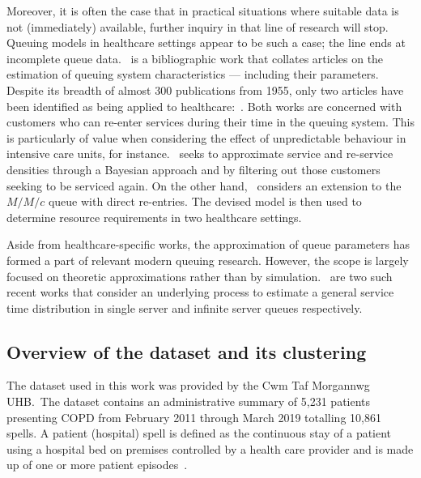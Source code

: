 \documentclass[11pt]{article}
\begin{document}
Moreover, it is often the case that in practical situations where suitable data
is not (immediately) available, further inquiry in that line of research will
stop.  Queuing models in healthcare settings appear to be such a case; the line
ends at incomplete queue data.~\cite{Asanjarani2017} is a bibliographic work
that collates articles on the estimation of queuing system characteristics ---
including their parameters.  Despite its breadth of almost 300 publications from
1955, only two articles have been identified as being applied to
healthcare:~\cite{Mohammadi2012,Yom2014}. Both works are concerned with
customers who can re-enter services during their time in the queuing system.
This is particularly of value when considering the effect of unpredictable
behaviour in intensive care units, for instance.~\cite{Mohammadi2012} seeks to
approximate service and re-service densities through a Bayesian approach and by
filtering out those customers seeking to be serviced again. On the other
hand,~\cite{Yom2014} considers an extension to the \(M/M/c\) queue with direct
re-entries. The devised model is then used to determine resource requirements in
two healthcare settings.

Aside from healthcare-specific works, the approximation of queue parameters has
formed a part of relevant modern queuing research. However, the scope is largely
focused on theoretic approximations rather than by
simulation.~\cite{Djabali2018,Goldenshluger2016} are two such recent works that
consider an underlying process to estimate a general service time distribution
in single server and infinite server queues respectively.

\subsection{Overview of the dataset and its clustering}\label{subsec:overview}

The dataset used in this work was provided by the Cwm Taf Morgannwg UHB.\ The
dataset contains an administrative summary of 5,231 patients presenting COPD
from February 2011 through March 2019 totalling 10,861 spells. A patient
(hospital) spell is defined as the continuous stay of a patient using a hospital
bed on premises controlled by a health care provider and is made up of one or
more patient episodes~\cite{NHS2020}.
\end{document}
